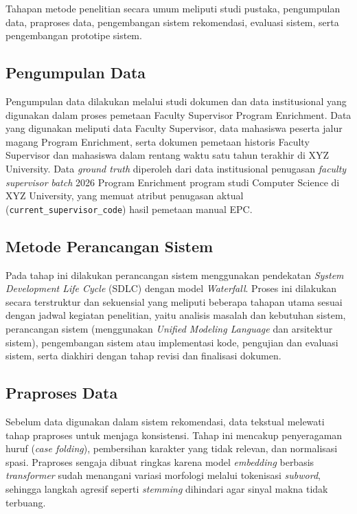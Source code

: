Tahapan metode penelitian secara umum meliputi studi pustaka, pengumpulan data, praproses data, pengembangan sistem rekomendasi, evaluasi sistem, serta pengembangan prototipe sistem.

\subsection{Pengumpulan Data}\label{pengumpulan-data}

Pengumpulan data dilakukan melalui studi dokumen dan data institusional yang digunakan dalam proses pemetaan Faculty Supervisor Program Enrichment. Data yang digunakan meliputi data Faculty Supervisor, data mahasiswa peserta jalur magang Program Enrichment, serta dokumen pemetaan historis Faculty Supervisor dan mahasiswa dalam rentang waktu satu tahun terakhir di XYZ University. Data \textit{ground truth} diperoleh dari data institusional penugasan \textit{faculty supervisor} \textit{batch} 2026 Program Enrichment program studi Computer Science di XYZ University, yang memuat atribut penugasan aktual (\texttt{current\_supervisor\_code}) hasil pemetaan manual EPC.

\subsection{Metode Perancangan Sistem}

Pada tahap ini dilakukan perancangan sistem menggunakan pendekatan \textit{System Development Life Cycle} (SDLC) dengan model \textit{Waterfall}. Proses ini dilakukan secara terstruktur dan sekuensial yang meliputi beberapa tahapan utama sesuai dengan jadwal kegiatan penelitian, yaitu analisis masalah dan kebutuhan sistem, perancangan sistem (menggunakan \textit{Unified Modeling Language} dan arsitektur sistem), pengembangan sistem atau implementasi kode, pengujian dan evaluasi sistem, serta diakhiri dengan tahap revisi dan finalisasi dokumen.

\subsection{Praproses Data}\label{praproses-data}

Sebelum data digunakan dalam sistem rekomendasi, data tekstual melewati tahap praproses untuk menjaga konsistensi. Tahap ini mencakup penyeragaman huruf (\textit{case folding}), pembersihan karakter yang tidak relevan, dan normalisasi spasi. Praproses sengaja dibuat ringkas karena model \textit{embedding} berbasis \textit{transformer} sudah menangani variasi morfologi melalui tokenisasi \textit{subword}, sehingga langkah agresif seperti \textit{stemming} dihindari agar sinyal makna tidak terbuang.

